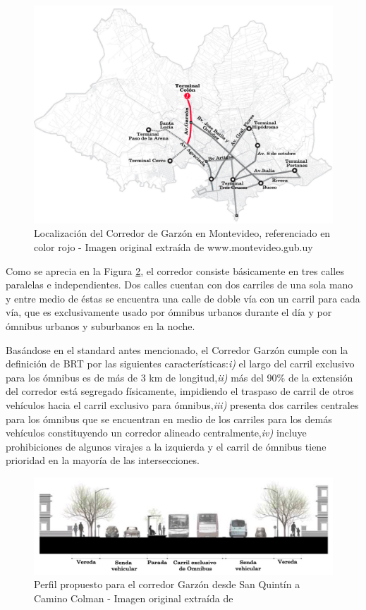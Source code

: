 \begin{figure}
	\centering
	\includegraphics[width=0.99\linewidth]{figures/Mapa_Garzon_0}
	\caption[Localización del Corredor de Garzón en Montevideo]{Localización del Corredor de Garzón en Montevideo, referenciado en color rojo - Imagen original extraída de www.montevideo.gub.uy		
	}
	\label{fig:Mapa_Garzon_0}
\end{figure}

Como se aprecia en la Figura \ref{fig:perfil_garzon}, el corredor consiste básicamente en tres calles paralelas e independientes. Dos calles cuentan con dos carriles de una sola mano y entre medio de éstas se encuentra una calle de doble vía con un carril para cada vía, que es exclusivamente usado por ómnibus urbanos durante el día y por ómnibus urbanos y suburbanos en la noche.

Basándose en el standard antes mencionado, el Corredor Garzón cumple con la definición de BRT por las siguientes características:\textit{i)} el largo del carril exclusivo para los ómnibus es de más de 3 km de longitud,\textit{ii)} más del 90\% de la extensión del corredor está segregado físicamente, impidiendo el traspaso de carril de otros vehículos hacia el carril exclusivo para ómnibus,\textit{iii)} presenta dos carriles centrales para los ómnibus que se encuentran en medio de los carriles para los demás vehículos constituyendo un corredor alineado centralmente,\textit{iv)} incluye prohibiciones de algunos virajes a la izquierda y el carril de ómnibus tiene prioridad en la mayoría de las intersecciones.


\begin{figure}
	\centering
	\includegraphics[width=0.9\linewidth]{Figures/busway_configuration}
	\caption[Perfil propuesto para el corredor Garzón.]{Perfil propuesto para el corredor Garzón desde San Quintín a Camino Colman - Imagen original extraída de \citep{PlanMovilidad}
	}
	\label{fig:perfil_garzon}
\end{figure}

